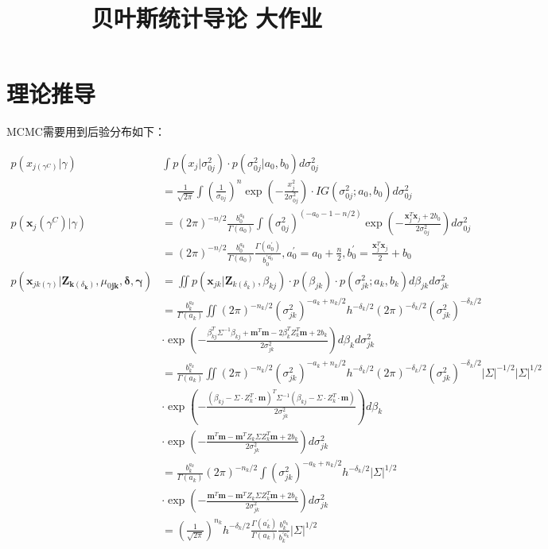 \documentclass[a4paper]{article}
\title{贝叶斯统计导论 大作业}
\author{}
\begin{document}
\maketitle


\section{理论推导}
MCMC需要用到后验分布如下：

$$
\begin{aligned}
p(x_{j(\gamma^C)}|\gamma) & \int p(x_j|\sigma^2_{0j})\cdot p(\sigma^2_{0j}|a_0, b_0)d\sigma^2_{0j}\\
&=\frac{1}{\sqrt{2\pi}}\int\left(\frac{1}{\sigma_{0j}}\right)^n\exp\left(-\frac{x_j^2}{2\sigma^2_{0j}}\right)\cdot IG(\sigma^2_{0j}; a_0, b_0)d\sigma^2_{0j}\\
p(\boldsymbol{x}_j(\gamma^C)|\gamma)&=({2\pi})^{-n/2}\frac{b_0^{a_0}}{\Gamma(a_0)}\int(\sigma^2_{0j})^{(-a_0-1-n/2)}\exp\left(-\frac{\boldsymbol x_j^T\boldsymbol x_j+2b_0}{2\sigma^2_{0j}}\right)d\sigma^2_{0j}\\
&=({2\pi})^{-n/2}\frac{b_0^{a_0}}{\Gamma(a_0)}\frac{\Gamma(a_0^{\prime})}{b_0^{\prime a_0^{\prime}}}, a_0^\prime = a_0+\frac{n}{2}, b_0^\prime = \frac{\boldsymbol x_j^T\boldsymbol x_j}{2} + b_0\\
p\left(\mathbf{x}_{j k(\gamma)} | \mathbf{Z}_{\mathbf{k}\left(\delta_{\mathbf{k}}\right)}, \mu_{0 \mathbf{j} \mathbf{k}}, \boldsymbol{\delta}, \boldsymbol{\gamma}\right) 
&=\iint p(\boldsymbol{x}_{jk}| \boldsymbol{Z}_{k(\delta_k)}, \beta_{kj})\cdot p(\beta_{jk})\cdot p(\sigma_{jk}^2;a_k, b_k)d\beta_{jk}d\sigma^2_{jk}\\
&=\frac{b_k^{a_k}}{\Gamma(a_k)}\iint(2\pi)^{-n_k/2}(\sigma_{jk}^2)^{-a_k+n_k/2}h^{-\delta_k/2}(2\pi)^{-\delta_k/2}(\sigma_{jk}^2)^{-\delta_k/2}\\ &\cdot\exp\left(-\frac{\beta^T_{kj}\Sigma^{-1}\beta_{kj}+\boldsymbol{m}^T\boldsymbol{m}-2\beta_k^TZ_k^T\boldsymbol{m}+2b_k}{2\sigma^2_{jk}}\right)d\beta_kd\sigma^2_{jk}\\
&=\frac{b_k^{a_k}}{\Gamma(a_k)}\iint(2\pi)^{-n_k/2}(\sigma_{jk}^2)^{-a_k+n_k/2}h^{-\delta_k/2}(2\pi)^{-\delta_k/2}(\sigma_{jk}^2)^{-\delta_k/2}|\Sigma|^{-1/2}|\Sigma|^{1/2}\\
&\cdot\exp\left(-\frac{(\beta_{kj}-\Sigma\cdot Z_k^T\cdot\boldsymbol{m})^T\Sigma^{-1}(\beta_{kj}-\Sigma\cdot Z_k^T\cdot\boldsymbol{m})}
{2\sigma^2_{jk}}\right)d\beta_k\\
&\cdot\exp\left(-\frac{\boldsymbol{m}^T\boldsymbol{m}-\boldsymbol{m}^TZ_k\Sigma Z_k^T\boldsymbol{m} +2b_k}{2\sigma^2_{jk}}\right)d\sigma^2_{jk}\\
&=\frac{b_k^{a_k}}{\Gamma(a_k)}(2\pi)^{-n_k/2}\int(\sigma_{jk}^2)^{-a_k+n_k/2}h^{-\delta_k/2}|\Sigma|^{1/2}\\
&\cdot\exp\left(-\frac{\boldsymbol{m}^T\boldsymbol{m}-\boldsymbol{m}^TZ_k\Sigma Z_k^T\boldsymbol{m} +2b_k}{2\sigma^2_{jk}}\right)d\sigma^2_{jk}\\
&=\left(\frac{1}{\sqrt{2 \pi}}\right)^{n_{k}}h^{-\delta_k/2} \frac{\Gamma\left(a_{k}^{\prime}\right)}{\Gamma\left(a_{k}\right)} \frac{b_{k}^{a_{k}}}{b_{k}^{\prime a_{k}^{\prime}}}|\Sigma|^{1/2}
\end{aligned}
$$
\end{document}
